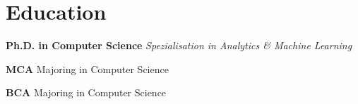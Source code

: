 \documentclass[ letterpaper]{twentysecondcv} %
\begin{document}
\makeprofile %



\section{Education}

\begin{twenty} %
  {\textbf{Ph.D. in Computer Science}}
  {}
  {\emph{Spezialisation in Analytics \& Machine Learning}}

  {\textbf{MCA}}
  {}
  {Majoring in Computer Science}

  {\textbf{BCA}}
  {}
  {Majoring in Computer Science}
\end{twenty}


%	
%	

%
%
%  
%
\end{document}
